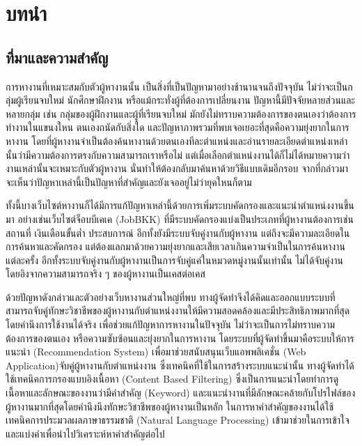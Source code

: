 \chapter{บทนำ}
\label{chapter:introduction}

\section{ที่มาและความสำคัญ}

การหางานที่เหมาะสมกับตัวผู้หางานนั้น เป็นสิ่งที่เป็นปัญหามาอย่างช้านานจนถึงปัจจุบัน ไม่ว่าจะเป็นกลุ่มผู้เรียนจบใหม่ นักศึกษาฝึกงาน หรือแม้กระทั่งผู้ที่ต้องการเปลี่ยนงาน ปัญหานี้มีปัจจัยหลายส่วนและหลายกลุ่ม เช่น กลุ่มของผู้ฝึกงานและผู้ที่เรียนจบใหม่ มักยังไม่ทราบความต้องการของตนเองว่าต้องการทำงานในแขนงใหน ตนเองถนัดกับสิ่งใด และปัญหาภาพรวมที่พบเจอเยอะที่สุดคือความยุ่งยากในการหางาน โดยที่ผู้หางานจำเป็นต้องค้นหางานด้วยตนเองทีละตำแหน่งและอ่านรายละเอียดตำแหน่งเหล่านั้นว่ามีความต้องการตรงกับความสามารถเราหรือไม่ แต่เมื่อเลือกตำแหน่งงานได้ก็ไม่ได้หมายความว่างานเหล่านั้นจะเหมาะกับตัวผู้หางาน นั่นทำให้ต้องกลับมาค้นหาด้วยวิธีแบบเดิมอีกรอบ จากที่กล่าวมาจะเห็นว่าปัญหาเหล่านี้เป็นปัญหาที่สำคัญและยังเจออยู่ไม่ว่ายุคใหนก็ตาม

ทั้งนี้บางเว็บไซต์หางานก็ได้มีการแก้ปัญหาเหล่านี้ด้วยการเพิ่มระบบคัดกรองและแนะนำตำแหน่งงานขึ้นมา อย่างเช่นเว็บไซต์จ็อบบีเคเค (JobBKK) ที่มีระบบคัดกรองแบ่งเป็นประเภทที่ผู้หางานต้องการเช่น สถานที่ เงินเดือนขั้นต่ำ ประสบการณ์ อีกทั้งยังมีระบบจับคู่งานกับผู้หางาน แต่ถึงจะมีความละเอียดในการค้นหาและคัดกรอง แต่ต้องแลกมาด้วยความยุ่งยากและเสียเวลาเกินความจำเป็นในการค้นหางานแต่ละครั้ง อีกทั้งระบบจับคู่งานกับผู้หางานเป็นการจับคู่แค่ในหมวดหมู่งานนั้นเท่านั้น ไม่ได้จับคู่งานโดยอิงจากความสามารถจริง ๆ ของผู้หางานเป็นเคสต่อเคส

ด้วยปัญหาดังกล่าวและตัวอย่างเว็บหางานส่วนใหญ่ที่พบ ทางผู้จัดทำจึงได้คิดและออกแบบระบบที่สามารถจับคู่ทักษะวิชาชีพของผู้หางานกับตำแหน่งงานให้มีความสอดคล้องและมีประสิทธิภาพมากที่สุด โดยคำนึงการใช้งานได้จริง เพื่อช่วยแก้ปัญหาการหางานในปัจจุบัน ไม่ว่าจะเป็นการไม่ทราบความต้องการของตนเอง หรือความซับซ้อนและยุ่งยากในการหางาน โดยระบบที่ผู้จัดทำขึ้นมาคือระบบให้การแนะนำ (Recommendation System) เพื่อมาช่วยสนับสนุนเว็บแอพพลิเคชั่น (Web Application)จับคู่ผู้หางานกับตำแหน่งงาน ซึ่งเทคนิคที่ใช้ในการสร้างระบบแนะนำนั้น ทางผู้จัดทำได้ใช้เทคนิคการกรองแบบอิงเนื้อหา (Content Based Filtering) ซึ่งเป็นการแนะนำโดยทำการดูเนื้อหาและลักษณะของงานว่ามีคำสำคัญ (Keyword) และแนะนำงานที่มีลักษณะคล้ายกับโปรไฟล์ของผู้หางานมากที่สุดโดยคำนึงนึงทักษะวิชาชีพของผู้หางานเป็นหลัก ในการหาคำสำคัญของงานได้ใช้เทคนิคการประมวลผลภาษาธรรมชาติ (Natural Language Processing) เข้ามาช่วยในการเข้าใจและแบ่งคำเพื่อนำไปวิเคราะห์หาคำสำคัญต่อไป

